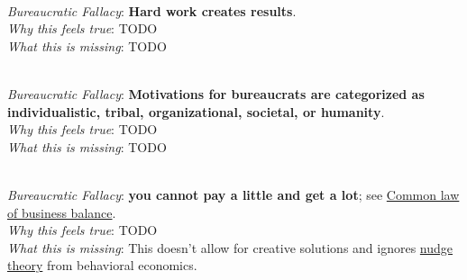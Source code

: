 \ \\

\textit{Bureaucratic Fallacy}: \textbf{Hard work creates results}.\\
\textit{Why this feels true}: TODO\\
\textit{What this is missing}: TODO


\ \\

\textit{Bureaucratic Fallacy}: \textbf{Motivations for bureaucrats are categorized as individualistic, tribal, organizational, societal, or humanity}.\\
\textit{Why this feels true}: TODO\\
\textit{What this is missing}: TODO


\ \\

\textit{Bureaucratic Fallacy}: 
\textbf{you cannot pay a little and get a lot}; see \href{https://en.wikipedia.org/wiki/Common_law_of_business_balance}{Common law of business balance}. \\
\textit{Why this feels true}: TODO\\
\textit{What this is missing}: This doesn't allow for creative solutions and ignores \href{https://en.wikipedia.org/wiki/Nudge_theory}{nudge theory} from behavioral economics. 

